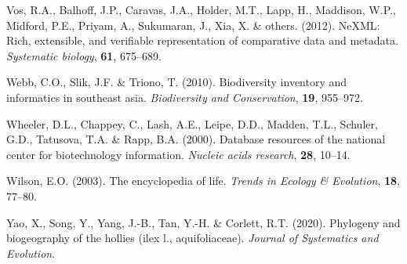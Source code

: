 \documentclass[]{article}
\begin{document}
\leavevmode\hypertarget{ref-vos2012nexml}{}%
Vos, R.A., Balhoff, J.P., Caravas, J.A., Holder, M.T., Lapp, H., Maddison, W.P., Midford, P.E., Priyam, A., Sukumaran, J., Xia, X. \& others. (2012). NeXML: Rich, extensible, and verifiable representation of comparative data and metadata. \emph{Systematic biology}, \textbf{61}, 675--689.

\leavevmode\hypertarget{ref-webb2010biodiversity}{}%
Webb, C.O., Slik, J.F. \& Triono, T. (2010). Biodiversity inventory and informatics in southeast asia. \emph{Biodiversity and Conservation}, \textbf{19}, 955--972.

\leavevmode\hypertarget{ref-wheeler2000database}{}%
Wheeler, D.L., Chappey, C., Lash, A.E., Leipe, D.D., Madden, T.L., Schuler, G.D., Tatusova, T.A. \& Rapp, B.A. (2000). Database resources of the national center for biotechnology information. \emph{Nucleic acids research}, \textbf{28}, 10--14.

\leavevmode\hypertarget{ref-wilson2003encyclopedia}{}%
Wilson, E.O. (2003). The encyclopedia of life. \emph{Trends in Ecology \& Evolution}, \textbf{18}, 77--80.

\leavevmode\hypertarget{ref-yao2020phylogeny}{}%
Yao, X., Song, Y., Yang, J.-B., Tan, Y.-H. \& Corlett, R.T. (2020). Phylogeny and biogeography of the hollies (ilex l., aquifoliaceae). \emph{Journal of Systematics and Evolution}.
\end{document}
